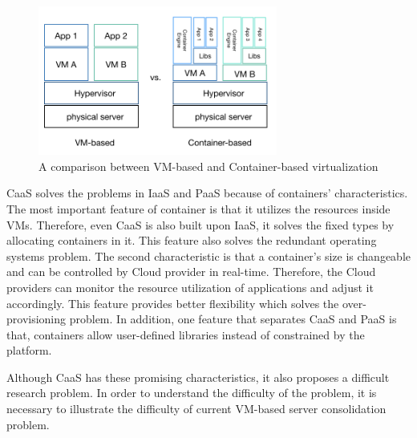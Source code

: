 \begin{figure}
	\centering
	\includegraphics[width=0.7\textwidth]{pics/comparison.png}
	\caption{A comparison between VM-based and Container-based virtualization}
	\label{fig:comparison}
\end{figure}

CaaS solves the problems in IaaS and PaaS because of containers' characteristics.
The most important feature of container is that it utilizes the resources inside VMs. 
Therefore, even CaaS is also built upon IaaS, it solves the fixed types by allocating containers in it. This feature also solves the redundant operating systems problem.
The second characteristic is that a container's size is changeable and can be controlled by 
Cloud provider in real-time. Therefore, the Cloud providers can monitor the resource utilization of applications and adjust it accordingly. This feature provides better flexibility which solves the over-provisioning problem. 
In addition, one feature that separates CaaS and PaaS is that, containers allow user-defined libraries instead of constrained by the platform.

Although CaaS has these promising characteristics, it also proposes a difficult research problem. In order to 
understand the difficulty of the problem, it is necessary to illustrate the difficulty of current VM-based server consolidation problem.


